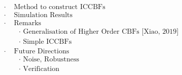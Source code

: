 \documentclass[preview]{standalone}
\begin{document}
\begin{align*}
\boldsymbol{\cdot} & \text{ Method to construct ICCBFs}\\ \boldsymbol{\cdot} &\text{ Simulation Results}\\ \boldsymbol{\cdot} &\text{ Remarks}\\ &\quad \boldsymbol{\cdot} \text{ Generalisation of Higher Order CBFs [Xiao, 2019]}\\ &\quad \boldsymbol{\cdot} \text{ Simple ICCBFs}\\ \boldsymbol{\cdot} & \text{ Future Directions}\\ &\quad \boldsymbol{\cdot} \text{ Noise, Robustness}\\ &\quad \boldsymbol{\cdot} \text{ Verification}
\end{align*}
\end{document}
